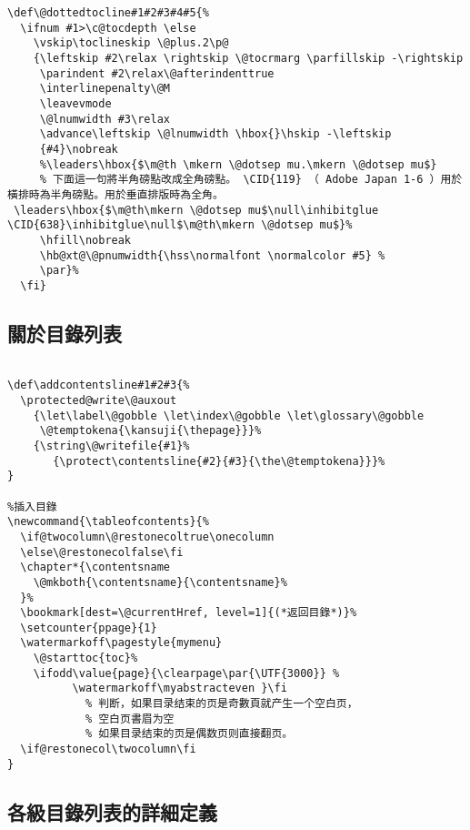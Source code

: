 \begin{lstlisting}[firstnumber=1318]
\def\@dottedtocline#1#2#3#4#5{%
  \ifnum #1>\c@tocdepth \else
    \vskip\toclineskip \@plus.2\p@
    {\leftskip #2\relax \rightskip \@tocrmarg \parfillskip -\rightskip
     \parindent #2\relax\@afterindenttrue
     \interlinepenalty\@M
     \leavevmode
     \@lnumwidth #3\relax
     \advance\leftskip \@lnumwidth \hbox{}\hskip -\leftskip
     {#4}\nobreak
     %\leaders\hbox{$\m@th \mkern \@dotsep mu.\mkern \@dotsep mu$}
     % 下面這一句將半角磅點改成全角磅點。 \CID{119} （ Adobe Japan 1-6 ）用於橫排時為半角磅點。用於垂直排版時為全角。
 \leaders\hbox{$\m@th\mkern \@dotsep mu$\null\inhibitglue \CID{638}\inhibitglue\null$\m@th\mkern \@dotsep mu$}%
     \hfill\nobreak
     \hb@xt@\@pnumwidth{\hss\normalfont \normalcolor #5} %
     \par}%
  \fi}
\end{lstlisting}

\subsection{關於目錄列表}

\begin{lstlisting}[firstnumber=1335]
% 在 class 里把关于頁碼的内容放到  \AtBeginDocument 里（見 class 末尾）

\def\addcontentsline#1#2#3{%
  \protected@write\@auxout
    {\let\label\@gobble \let\index\@gobble \let\glossary\@gobble
     \@temptokena{\kansuji{\thepage}}}%
    {\string\@writefile{#1}%
       {\protect\contentsline{#2}{#3}{\the\@temptokena}}}%
}

%插入目錄
\newcommand{\tableofcontents}{%
  \if@twocolumn\@restonecoltrue\onecolumn
  \else\@restonecolfalse\fi
  \chapter*{\contentsname
    \@mkboth{\contentsname}{\contentsname}%
  }%
  \bookmark[dest=\@currentHref, level=1]{(*返回目錄*)}%
  \setcounter{ppage}{1}
  \watermarkoff\pagestyle{mymenu}
    \@starttoc{toc}%
    \ifodd\value{page}{\clearpage\par{\UTF{3000}} %
          \watermarkoff\myabstracteven }\fi
            % 判断，如果目录结束的页是奇數頁就产生一个空白页，
    		% 空白页書眉为空
    		% 如果目录结束的页是偶数页则直接翻页。
  \if@restonecol\twocolumn\fi
}
\end{lstlisting}

\subsection{各級目錄列表的詳細定義}

